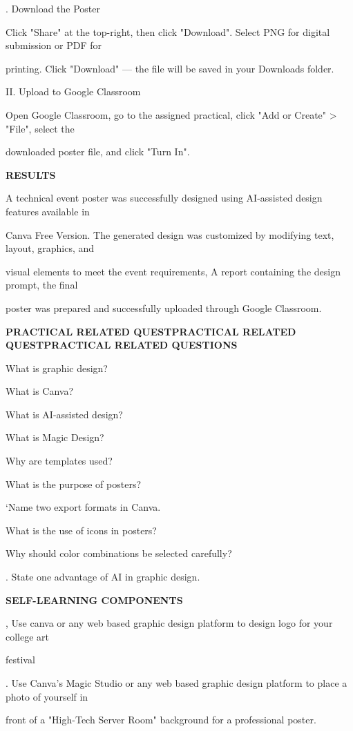 \documentclass[10pt,a4paper]{article}
\begin{document}
. Download the Poster\par
\noindent Click "Share" at the top-right, then click "Download". Select PNG for digital submission or PDF for\par
\noindent printing. Click "Download" — the file will be saved in your Downloads folder.\par
\noindent II. Upload to Google Classroom\par
\clearpage
\noindent Open Google Classroom, go to the assigned practical, click "Add or Create" > "File", select the\par
\noindent downloaded poster file, and click "Turn In".\par

\medskip\noindent\textbf{RESULTS}\par
\noindent A technical event poster was successfully designed using AI-assisted design features available in\par
\noindent Canva Free Version. The generated design was customized by modifying text, layout, graphics, and\par
\noindent visual elements to meet the event requirements, A report containing the design prompt, the final\par
\noindent poster was prepared and successfully uploaded through Google Classroom.\par
\medskip\noindent\textbf{PRACTICAL RELATED QUESTPRACTICAL RELATED QUESTPRACTICAL RELATED QUESTIONS}\par
\noindent What is graphic design?\par
\noindent What is Canva?\par
\noindent What is AI-assisted design?\par
\noindent What is Magic Design?\par
\noindent Why are templates used?\par
\noindent What is the purpose of posters?\par
\noindent ‘Name two export formats in Canva.\par
\noindent What is the use of icons in posters?\par
\noindent Why should color combinations be selected carefully?\par
{}. State one advantage of AI in graphic design.\par

\medskip\noindent\textbf{SELF-LEARNING COMPONENTS}\par
{}, Use canva or any web based graphic design platform to design logo for your college art\par
\noindent festival\par
{}. Use Canva’s Magic Studio or any web based graphic design platform to place a photo of yourself in\par
\noindent front of a "High-Tech Server Room" background for a professional poster.\par
\end{document}
